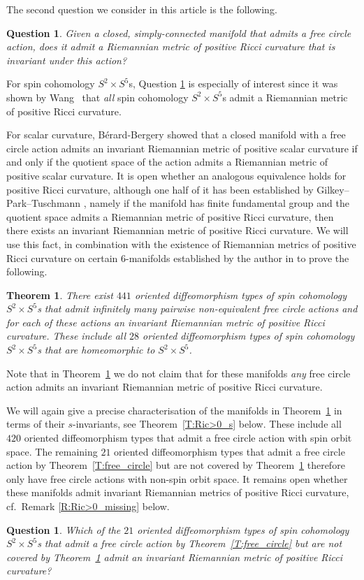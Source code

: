 \documentclass[10pt,a4paper]{amsart}
\numberwithin{equation}{section}
\newtheorem{theoremAlph}{Theorem}
\newtheorem{Question}[Theorem]{Question}
\theoremstyle{definition}
\numberwithin{table}{section}
\begin{document}
The second question we consider in this article is the following.
\begin{Question}\label{Q:free_circ_Ric}
	Given a closed, simply-connected manifold that admits a free circle action, does it admit a Riemannian metric of positive Ricci curvature that is invariant under this action?
\end{Question}

For spin cohomology $S^2\times S^5$s, Question \ref{Q:free_circ_Ric} is especially of interest since it was shown by Wang~\cite{Wa22} that \emph{all} spin cohomology $S^2\times S^5$s admit a Riemannian metric of positive Ricci curvature.

For scalar curvature, B\'erard-Bergery \cite{BB83} showed that a closed manifold with a free circle action admits an invariant Riemannian metric of positive scalar curvature if and only if the quotient space of the action admits a Riemannian metric of positive scalar curvature. It is open whether an analogous equivalence holds for positive Ricci curvature, although one half of it has been established by Gilkey--Park--Tuschmann \cite{GPT98}, namely if the manifold has finite fundamental group and the quotient space admits a Riemannian metric of positive Ricci curvature, then there exists an invariant Riemannian metric of positive Ricci curvature. We will use this fact, in combination with the existence of Riemannian metrics of positive Ricci curvature on certain $6$-manifolds established by the author in \cite{Re24b} to prove the following.	
\begin{theoremAlph}\label{T:Ric>0}
	There exist $441$ oriented diffeomorphism types of spin cohomology $S^2\times S^5$s that admit infinitely many pairwise non-equivalent free circle actions and for each of these actions an invariant Riemannian metric of positive Ricci curvature. These include all $28$ oriented diffeomorphism types of spin cohomology $S^2\times S^5$s that are homeomorphic to $S^2\times S^5$.
\end{theoremAlph}

Note that in Theorem~\ref{T:Ric>0} we do not claim that for these manifolds \emph{any} free circle action admits an invariant Riemannian metric of positive Ricci curvature.

We will again give a precise characterisation of the manifolds in Theorem~\ref{T:Ric>0} in terms of their $s$-invariants, see Theorem~\ref{T:Ric>0_s} below. These include all $420$ oriented diffeomorphism types that admit a free circle action with spin orbit space. The remaining $21$ oriented diffeomorphism types that admit a free circle action by Theorem~\ref{T:free_circle} but are not covered by Theorem~\ref{T:Ric>0} therefore only have free circle actions with non-spin orbit space. It remains open whether these manifolds admit invariant Riemannian metrics of positive Ricci curvature, cf.\ Remark \ref{R:Ric>0_missing} below.
\begin{Question}\label{Q:Ric>0_missing}
	Which of the $21$ oriented diffeomorphism types of spin cohomology $S^2\times S^5$s that admit a free circle action by Theorem~\ref{T:free_circle} but are not covered by Theorem~\ref{T:Ric>0} admit an invariant Riemannian metric of positive Ricci curvature?
\end{Question}
\end{document}
